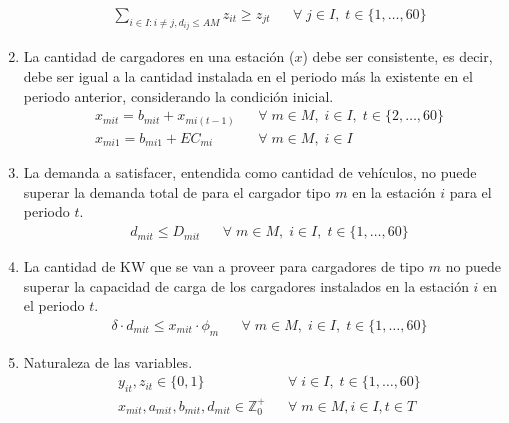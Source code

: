 \documentclass[letterpaper]{article}
\begin{document}
\begin{flushleft}
\begin{enumerate}
		      \begin{align*}
			       & \sum_{i \in I: i \neq j, d_{ij}\leq AM} z_{it} \geq z_{jt} &  & \forall \; j \in I, \; t \in \{1, \ldots, 60\}
		      \end{align*}
		\item La cantidad de cargadores en una estaci\'on ($x$) debe ser consistente, es decir, debe ser igual a la cantidad instalada en el periodo más la existente en el periodo anterior, considerando la condici\'on inicial.
		      \begin{align*}
			       & x_{mit} = b_{mit} + x_{mi(t-1)} &  & \forall \; m \in M, \; i \in I, \; t \in \{2, \ldots, 60\} \\
			       & x_{mi1} = b_{mi1} + EC_{mi}     &  & \forall \; m \in M, \; i \in I
		      \end{align*}
		\item La demanda a satisfacer, entendida como cantidad de vehículos, no puede superar la demanda total de para el cargador tipo $m$ en la estación $i$ para el periodo $t$.
		      \begin{align*}
			       & d_{mit} \leq D_{mit} &  & \forall \; m \in M, \; i \in I, \; t \in \{1, \ldots, 60\}
		      \end{align*}
		\item La cantidad de KW que se van a proveer para cargadores de tipo $m$ no puede superar la capacidad de carga de los cargadores instalados en la estación $i$ en el periodo $t$.
		      \begin{align*}
			       & \delta \cdot d_{mit} \leq x_{mit} \cdot \phi_m &  & \forall \; m \in M, \; i \in I, \; t \in \{1, \ldots, 60\}
		      \end{align*}
		\item Naturaleza de las variables.
		      \begin{align*}
			       & y_{it}, z_{it} \in \{0, 1\}                             &  & \forall \; i \in I, \; t \in \{1, \ldots, 60\} \\
			       & x_{mit}, a_{mit}, b_{mit}, d_{mit} \in \mathbb{Z}^{+}_0 &  & \forall \; m\in M, i\in I, t\in T
		      \end{align*}
	\end{enumerate}


\end{flushleft}
\end{document}
